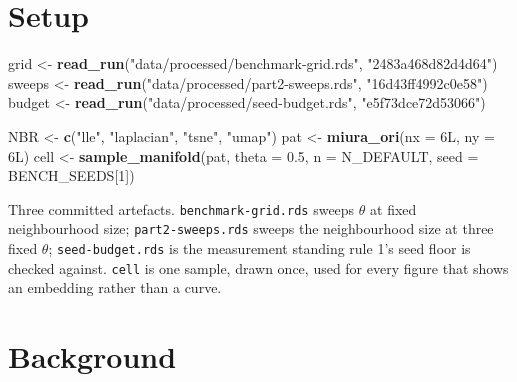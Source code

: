 \documentclass[
  british,
  a4paper,
]{book}
\newenvironment{Shaded}{\begin{snugshade}}{\end{snugshade}}
\newcommand{\AttributeTok}[1]{\textcolor[rgb]{0.13,0.29,0.53}{#1}}
\newcommand{\ConstantTok}[1]{\textcolor[rgb]{0.56,0.35,0.01}{#1}}
\newcommand{\DataTypeTok}[1]{\textcolor[rgb]{0.13,0.29,0.53}{#1}}
\newcommand{\DecValTok}[1]{\textcolor[rgb]{0.00,0.00,0.81}{#1}}
\newcommand{\FloatTok}[1]{\textcolor[rgb]{0.00,0.00,0.81}{#1}}
\newcommand{\FunctionTok}[1]{\textcolor[rgb]{0.13,0.29,0.53}{\textbf{#1}}}
\newcommand{\NormalTok}[1]{#1}
\newcommand{\OtherTok}[1]{\textcolor[rgb]{0.56,0.35,0.01}{#1}}
\newcommand{\SpecialCharTok}[1]{\textcolor[rgb]{0.81,0.36,0.00}{\textbf{#1}}}
\newcommand{\StringTok}[1]{\textcolor[rgb]{0.31,0.60,0.02}{#1}}
\begin{document}
\section{Setup}\label{nbr-setup}

\begin{Shaded}
\begin{Highlighting}[]
\NormalTok{grid   }\OtherTok{\textless{}{-}} \FunctionTok{read\_run}\NormalTok{(}\StringTok{"data/processed/benchmark{-}grid.rds"}\NormalTok{, }\StringTok{"2483a468d82d4d64"}\NormalTok{)}
\NormalTok{sweeps }\OtherTok{\textless{}{-}} \FunctionTok{read\_run}\NormalTok{(}\StringTok{"data/processed/part2{-}sweeps.rds"}\NormalTok{,   }\StringTok{"16d43ff4992c0e58"}\NormalTok{)}
\NormalTok{budget }\OtherTok{\textless{}{-}} \FunctionTok{read\_run}\NormalTok{(}\StringTok{"data/processed/seed{-}budget.rds"}\NormalTok{,    }\StringTok{"e5f73dce72d53066"}\NormalTok{)}

\NormalTok{NBR  }\OtherTok{\textless{}{-}} \FunctionTok{c}\NormalTok{(}\StringTok{"lle"}\NormalTok{, }\StringTok{"laplacian"}\NormalTok{, }\StringTok{"tsne"}\NormalTok{, }\StringTok{"umap"}\NormalTok{)}
\NormalTok{pat  }\OtherTok{\textless{}{-}} \FunctionTok{miura\_ori}\NormalTok{(}\AttributeTok{nx =} \DecValTok{6}\DataTypeTok{L}\NormalTok{, }\AttributeTok{ny =} \DecValTok{6}\DataTypeTok{L}\NormalTok{)}
\NormalTok{cell }\OtherTok{\textless{}{-}} \FunctionTok{sample\_manifold}\NormalTok{(pat, }\AttributeTok{theta =} \FloatTok{0.5}\NormalTok{, }\AttributeTok{n =}\NormalTok{ N\_DEFAULT, }\AttributeTok{seed =}\NormalTok{ BENCH\_SEEDS[}\DecValTok{1}\NormalTok{])}
\end{Highlighting}
\end{Shaded}

Three committed artefacts. \texttt{benchmark-grid.rds} sweeps \(\theta\) at fixed
neighbourhood size; \texttt{part2-sweeps.rds} sweeps the neighbourhood size at three
fixed \(\theta\); \texttt{seed-budget.rds} is the measurement standing rule 1's seed
floor is checked against. \texttt{cell} is one sample, drawn once, used for every
figure that shows an embedding rather than a curve.

\section{Background}\label{nbr-background}

\begin{Shaded}
\end{Shaded}
\end{document}
